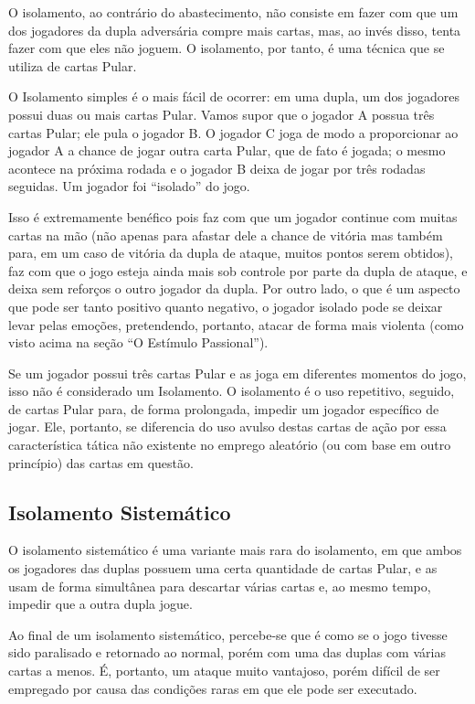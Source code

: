 O isolamento, ao contrário do abastecimento, não consiste em fazer com que um dos jogadores da dupla adversária compre mais cartas, mas, ao invés disso, tenta fazer com que eles não joguem. O isolamento, por tanto, é uma técnica que se utiliza de cartas Pular.

O Isolamento simples é o mais fácil de ocorrer: em uma dupla, um dos jogadores possui duas ou mais cartas Pular. Vamos supor que o jogador A possua três cartas Pular; ele pula o jogador B. O jogador C joga de modo a proporcionar ao jogador A a chance de jogar outra carta Pular, que de fato é jogada; o mesmo acontece na próxima rodada e o jogador B deixa de jogar por três rodadas seguidas. Um jogador foi ``isolado'' do jogo.

Isso é extremamente benéfico pois faz com que um jogador continue com muitas cartas na mão (não apenas para afastar dele a chance de vitória mas também para, em um caso de vitória da dupla de ataque, muitos pontos serem obtidos), faz com que o jogo esteja ainda mais sob controle por parte da dupla de ataque, e deixa sem reforços o outro jogador da dupla. Por outro lado, o que é um aspecto que pode ser tanto positivo quanto negativo, o jogador isolado pode se deixar levar pelas emoções, pretendendo, portanto, atacar de forma mais violenta (como visto acima na seção ``O Estímulo Passional'').

Se um jogador possui três cartas Pular e as joga em diferentes momentos do jogo, isso não é considerado um Isolamento. O isolamento é o uso repetitivo, seguido, de cartas Pular para, de forma prolongada, impedir um jogador específico de jogar. Ele, portanto, se diferencia do uso avulso destas cartas de ação por essa característica tática não existente no emprego aleatório (ou com base em outro princípio) das cartas em questão.

\subsection{Isolamento Sistemático}

O isolamento sistemático é uma variante mais rara do isolamento, em que ambos os jogadores das duplas possuem uma certa quantidade de cartas Pular, e as usam de forma simultânea para descartar várias cartas e, ao mesmo tempo, impedir que a outra dupla jogue.

Ao final de um isolamento sistemático, percebe-se que é como se o jogo tivesse sido paralisado e retornado ao normal, porém com uma das duplas com várias cartas a menos. É, portanto, um ataque muito vantajoso, porém difícil de ser empregado por causa das condições raras em que ele pode ser executado.

